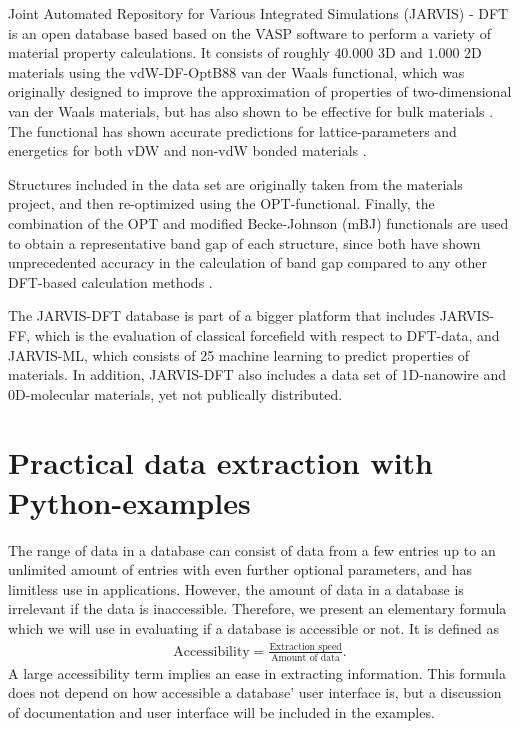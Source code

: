 Joint Automated Repository for Various Integrated Simulations (JARVIS) \cite{Choudhary2020} - DFT is an open database based based on the VASP software to perform a variety of material property calculations. It consists of roughly $40.000$ 3D and $1.000$ 2D materials using the vdW-DF-OptB88 van der Waals functional, which was originally designed to improve the approximation of properties of two-dimensional van der Waals materials, but has also shown to be effective for bulk materials \cite{Thonhauser2007, Klimes2011}. The functional has shown accurate predictions for lattice-parameters and energetics for both vDW and non-vdW bonded materials  \cite{Choudhary2018}.

Structures included in the data set are originally taken from the materials project, and then re-optimized using the OPT-functional. Finally, the combination of the OPT and modified Becke-Johnson (mBJ) functionals are used to obtain a representative band gap of each structure, since both have shown unprecedented accuracy in the calculation of band gap compared to any other DFT-based calculation methods \cite{Choudhary2018a}.


The JARVIS-DFT database is part of a bigger platform that includes JARVIS-FF, which is the evaluation of classical forcefield with respect to DFT-data, and JARVIS-ML, which consists of 25 machine learning to predict properties of materials. In addition, JARVIS-DFT also includes a data set of 1D-nanowire and 0D-molecular materials, yet not publically distributed.

\section{Practical data extraction with Python-examples}

The range of data in a database can consist of data from a few entries up to an unlimited amount of entries with even further optional parameters, and has limitless use in applications. However, the amount of data in a database is irrelevant if the data is inaccessible. Therefore, we present an elementary formula which we will use in evaluating if a database is accessible or not. It is defined as
\begin{align}
  \text{Accessibility} = \frac{\text{Extraction speed}}{\text{Amount of data}}.
\end{align}
A large accessibility term implies an ease in extracting information. This formula does not depend on how accessible a database' user interface is, but a discussion of documentation and user interface will be included in the examples.

